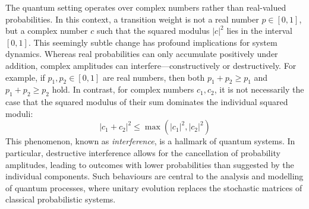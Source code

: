 The quantum setting operates over complex numbers rather than real-valued probabilities.  
%
In this context, a transition weight is not a real number $p \in [0,1]$, but a complex number $c$ such that the squared modulus $|c|^2$ lies in the interval $[0,1]$.  
%
This seemingly subtle change has profound implications for system dynamics.  
%
Whereas real probabilities can only accumulate positively under addition, complex amplitudes can interfere—constructively or destructively.  
%
For example, if $p_1, p_2 \in [0,1]$ are real numbers, then both $p_1 + p_2 \geq p_1$ and $p_1 + p_2 \geq p_2$ hold.  
%
In contrast, for complex numbers $c_1, c_2$, it is not necessarily the case that the squared modulus of their sum dominates the individual squared moduli:  
\[
|c_1 + c_2|^2 \leq \max\left(|c_1|^2, |c_2|^2\right)
\]
%
This phenomenon, known as \emph{interference}, is a hallmark of quantum systems.  
%
In particular, destructive interference allows for the cancellation of probability amplitudes, leading to outcomes with lower probabilities than suggested by the individual components.  
%
Such behaviours are central to the analysis and modelling of quantum processes, where unitary evolution replaces the stochastic matrices of classical probabilistic systems.



